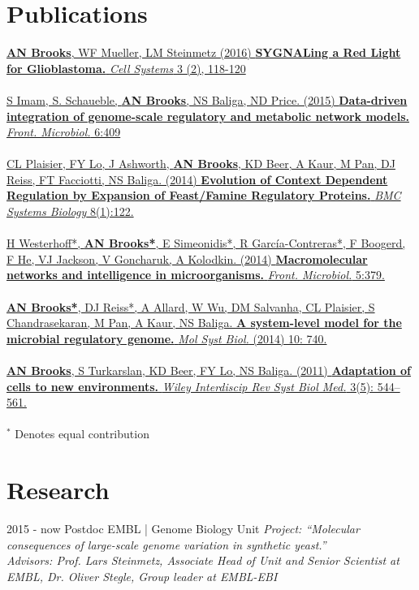 \documentclass[]{friggeri-cv}
\begin{document}
\section{Publications}
\href{http://journal.frontiersin.org/article/10.3389/fmicb.2015.00409/abstract}{\noindent
\textbf{AN Brooks}, WF Mueller, LM Steinmetz (2016)
\textbf{SYGNALing a Red Light for Glioblastoma.}
\emph{Cell Systems}  3 (2), 118-120
}
\\
\\
\href{http://journal.frontiersin.org/article/10.3389/fmicb.2015.00409/abstract}{\noindent
S Imam, S. Schaueble,  \textbf{AN Brooks}, NS Baliga, ND Price. (2015)
\textbf{Data-driven integration of genome-scale regulatory and metabolic network models.}
\emph{Front. Microbiol.} 6:409
}
\\
\\
\href{http://www.biomedcentral.com/1752-0509/8/122}{\noindent
CL Plaisier, FY Lo, J Ashworth, \textbf{AN Brooks}, KD Beer, A Kaur, M Pan, DJ Reiss, FT Facciotti, NS Baliga. (2014)
\textbf{Evolution of Context Dependent Regulation by Expansion of Feast/Famine Regulatory Proteins.}
\emph{BMC Systems Biology} 8(1):122.
}
\\
\\
\href{http://journal.frontiersin.org/article/10.3389/fmicb.2014.00379/abstract}{\noindent
H Westerhoff*, \textbf{AN Brooks*}, E Simeonidis*, R García-Contreras*, F Boogerd, F He, VJ Jackson, V Goncharuk, A Kolodkin. (2014)
\textbf{Macromolecular networks and intelligence in microorganisms.}
\emph{Front. Microbiol.} 5:379.
}
\\
\\
\href{http://msb.embopress.org/cgi/pmidlookup?view=long&pmid=25028489}{\noindent
\textbf{AN Brooks*}, DJ Reiss*, A Allard, W Wu, DM Salvanha, CL Plaisier, S Chandrasekaran, M Pan, A Kaur, NS Baliga.
\textbf{A system-level model for the microbial regulatory genome.}
\emph{Mol Syst Biol.} (2014) 10: 740.
}
\\
\\
\href{http://www.ncbi.nlm.nih.gov/pubmed/21197660}{\noindent
\textbf{AN Brooks}, S Turkarslan, KD Beer, FY Lo, NS Baliga. (2011)
\textbf{Adaptation of cells to new environments.}
\emph{Wiley Interdiscip Rev Syst Biol Med.} 3(5): 544–561.
}
\\
\\
$^{\ast}$ Denotes equal contribution

\section{Research}
\begin{entrylist}
  \entry
    {2015 - now}
    {Postdoc}
    {EMBL | Genome Biology Unit}
    {\emph{Project: ``Molecular consequences of large-scale genome variation in synthetic yeast.''}\\
    \emph{Advisors: Prof. Lars Steinmetz, Associate Head of Unit and Senior Scientist at EMBL, Dr. Oliver Stegle, Group leader at EMBL-EBI }\\}
\end{entrylist}
\end{document}
